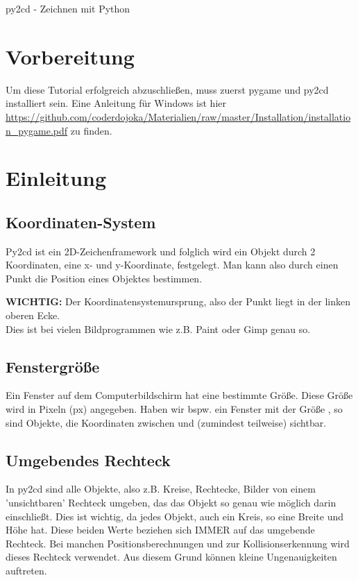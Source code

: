 \documentclass{\VorlagenPfad/coderdojokatext}
\newcommand{\Titel}{py2cd - Zeichnen mit Python}
\begin{document}
\begin{center}
	{\huge \Titel}
\end{center}

\section{Vorbereitung}
Um diese Tutorial erfolgreich abzuschließen, muss zuerst pygame und py2cd installiert sein. Eine Anleitung für Windows ist hier \url{https://github.com/coderdojoka/Materialien/raw/master/Installation/installation_pygame.pdf} zu finden.

\section{Einleitung}

\subsection{Koordinaten-System}
Py2cd ist ein 2D-Zeichenframework und folglich wird ein Objekt durch 2 Koordinaten, eine x- und y-Koordinate, festgelegt. Man kann also durch einen Punkt  die Position eines Objektes bestimmen.
\begin{merkbox}
\textbf{WICHTIG:} Der Koordinatensystemursprung, also der Punkt  liegt in der linken oberen Ecke.
\\Dies ist bei vielen Bildprogrammen wie z.B. Paint oder Gimp genau so.
\end{merkbox}

\subsection{Fenstergröße}
Ein Fenster auf dem Computerbildschirm hat eine bestimmte Größe. Diese Größe wird in Pixeln (px) angegeben. Haben wir bspw. ein Fenster mit der Größe ,
so sind Objekte, die Koordinaten zwischen  und  (zumindest teilweise) sichtbar.

\subsection{Umgebendes Rechteck}
In py2cd sind alle Objekte, also z.B. Kreise, Rechtecke, Bilder von einem 'unsichtbaren' Rechteck umgeben, das das Objekt so genau wie möglich darin einschließt. Dies ist wichtig, da jedes Objekt, auch ein Kreis, so eine Breite und Höhe hat. Diese beiden Werte beziehen sich IMMER auf das umgebende Rechteck. Bei manchen Positionsberechnungen und zur Kollisionserkennung wird dieses Rechteck verwendet. Aus diesem Grund können kleine Ungenauigkeiten auftreten. 
\end{document}

